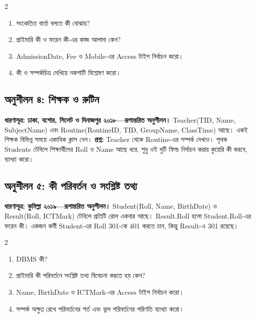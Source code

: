 \begin{multicols}{2}
\small
\begin{enumerate}
\item[ক.] সংকেতিত বার্তা বলতে কী বোঝায়?
\item[খ.] প্রাইমারি কী ও ফরেন কী-এর কাজ আলাদা কেন?
\item[গ.] AdmissionDate, Fee ও Mobile-এর Access টাইপ নির্বাচন করো।
\item[ঘ.] কী ও সম্পর্কচিত্র দেখিয়ে নকশাটি বিশ্লেষণ করো।
\end{enumerate}
\small

\end{multicols}


\subsection{অনুশীলন ৪: শিক্ষক ও রুটিন}
\textbf{ধারণাসূত্র: ঢাকা, যশোর, সিলেট ও দিনাজপুর ২০১৮—রূপান্তরিত অনুশীলন।}
Teacher(TID, Name, SubjectName) এবং Routine(RoutineID, TID, GroupName, ClassTime) আছে। একই শিক্ষক বিভিন্ন সময়ে একাধিক ক্লাস নেন।
\textbf{প্রশ্ন:} Teacher থেকে Routine-এর সম্পর্ক দেখাও। পৃথক Students টেবিলে শিক্ষার্থীদের Roll ও Name আছে ধরে, শুধু ওই দুটি ফিল্ড নির্বাচন করার কুয়েরি কী করবে, ব্যাখ্যা করো।



\subsection{অনুশীলন ৫: কী পরিবর্তন ও সংশ্লিষ্ট তথ্য}
\textbf{ধারণাসূত্র: কুমিল্লা ২০১৯—রূপান্তরিত অনুশীলন।}
Student(Roll, Name, BirthDate) ও Result(Roll, ICTMark) টেবিলে প্রতিটি রোল একবার আছে। Result.Roll হলো Student.Roll-এর ফরেন কী। একজন কর্মী Student-এর Roll 301-কে 401 করতে চান, কিন্তু Result-এ 301 রয়েছে।
\begin{multicols}{2}
\small
\begin{enumerate}
\item[ক.] DBMS কী?
\item[খ.] প্রাইমারি কী পরিবর্তনে সংশ্লিষ্ট তথ্য বিবেচনা করতে হয় কেন?
\item[গ.] Name, BirthDate ও ICTMark-এর Access টাইপ নির্বাচন করো।
\item[ঘ.] সম্পর্ক অক্ষুণ্ণ রেখে পরিবর্তনের শর্ত এবং ভুল পরিবর্তনের পরিণতি ব্যাখ্যা করো।
\end{enumerate}
\small

\end{multicols}


